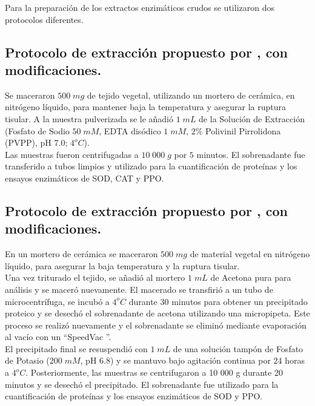 Para la preparación de los extractos enzimáticos crudos se utilizaron dos protocolos diferentes. 

\subsection{Protocolo de extracci\'on propuesto por \cite{liu2010exogenous}, con modificaciones.} \label{p1}

Se maceraron $500 \; mg$ de tejido vegetal, utilizando un mortero de cerámica, en nitrógeno líquido, para mantener baja la temperatura y asegurar la ruptura tisular. A la muestra pulverizada se le añadió $1\;mL$ de la Solución de Extracción (Fosfato de Sodio $50\;mM$, EDTA dis\'odico $1\;mM$, $2\%$ Polivinil Pirrolidona (PVPP), pH 7.0; $4^oC$).\\

Las muestras fueron centrifugadas a $10\;000\;g$ por $5$ minutos. El sobrenadante fue transferido a tubos limpios y utilizado para la cuantificación de proteínas y los ensayos enzimáticos de SOD, CAT y PPO. \\

\subsection{Protocolo de extracci\'on propuesto por \cite{baquero2005catalase}, con modificaciones.} \label{p2}

En un mortero de cer\'amica se maceraron $500\;mg$ de material vegetal en nitr\'ogeno l\'iquido, para asegurar la baja temperatura y la ruptura tisular. \\

Una vez triturado el tejido, se a\~nadi\'o al mortero $1\;mL$ de Acetona pura para an\'alisis y se macer\'o nuevamente. El macerado se transfiri\'o a un tubo de microcentr\'ifuga, se incub\'o a $4^oC$ durante 30 minutos para obtener un precipitado proteico y se desech\'o el sobrenadante de acetona utilizando una micropipeta. Este proceso se realiz\'o nuevamente y el sobrenadante se elimin\'o mediante evaporaci\'on al vac\'io con un \textquotedblleft SpeedVac \textquotedblright. \\

El precipitado final se resuspendi\'o con $1\;mL$ de una soluci\'on tamp\'on de Fosfato de Potasio ($200\;mM$, pH 6.8) y se mantuvo bajo agitación continua por $24$ horas a $4^oC$. Posteriormente, las muestras se centrifugaron a 10 000 g durante 20 minutos y se desech\'o el precipitado. El sobrenadante fue utilizado para la cuantificación de proteínas y los ensayos enzimáticos de SOD y PPO.\\

